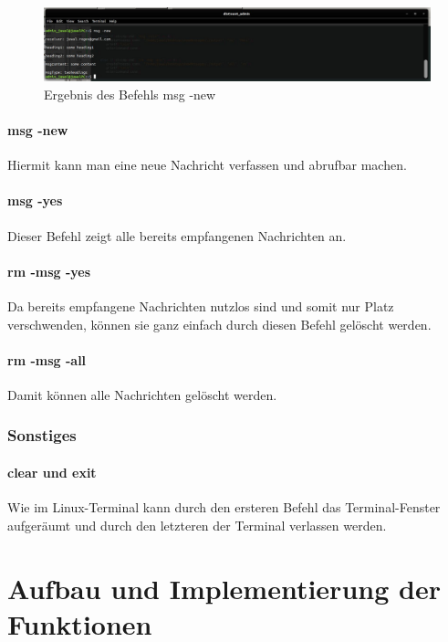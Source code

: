 \documentclass[12pt]{report}
\begin{document}
\begin{figure}[b]
	\centering
	\includegraphics[width=15cm]{images/msg_new}
	\caption[Befehl msg -new]{Ergebnis des Befehls msg -new}
\end{figure}
  
\subsubsection{msg -new}
Hiermit kann man eine neue Nachricht verfassen und abrufbar machen.



\subsubsection{msg -yes}
Dieser Befehl zeigt alle bereits empfangenen Nachrichten an.



\subsubsection{rm -msg -yes}
Da bereits empfangene Nachrichten nutzlos sind und somit nur Platz verschwenden, können sie ganz einfach durch diesen Befehl gelöscht werden.

\subsubsection{rm -msg -all}
Damit können alle Nachrichten gelöscht werden.


\subsection{Sonstiges}

\subsubsection{clear und exit}
Wie im Linux-Terminal kann durch den ersteren Befehl das Terminal-Fenster aufgeräumt und durch den letzteren der Terminal verlassen werden. 


\chapter{Aufbau und Implementierung der Funktionen}
\end{document}

